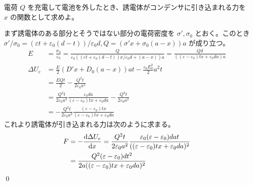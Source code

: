 \documentclass[uplatex,dvipdfmx,a4paper,11pt]{jlreq}
\makeatletter
\theoremstyle{definition}
\renewenvironment{proof}[1][\proofname]{\par
  \normalfont
  \topsep6\p@\@plus6\p@ \trivlist
  \item[\hskip\labelsep{\bfseries #1}\@addpunct{\bfseries}]\ignorespaces\quad\par
}{%
  \qed\endtrivlist\@endpefalse
}
\renewcommand\proofname{証明}
\makeatother
\begin{document}
\begin{problem}
電荷 $Q$ を充電して電池を外したとき、誘電体がコンデンサに引き込まれる力を $x$ の関数として求めよ。
\end{problem}
\begin{proof}
  まず誘電体のある部分とそうではない部分の電荷密度を $\sigma', \sigma_0$ とおく。このとき $\sigma'/\sigma_0 = (\varepsilon t + \varepsilon_0(d - t))/\varepsilon_0d, Q = (\sigma'x + \sigma_0(a - x))a$ が成り立つ。
  \begin{align}
    E          & = \frac{\sigma_0}{\varepsilon_0} = \frac{Q}{\varepsilon_0((\varepsilon t + \varepsilon_0(d - t))x/\varepsilon_0d + (a - x))a} = \frac{Qd}{((\varepsilon - \varepsilon_0)tx + \varepsilon_0da)a} \\
    \Delta U_e & = \frac{E}{2}(D'x + D_0(a - x))at - \frac{\varepsilon_0E_0^2}{2}a^2t                                                                                                                            \\
               & = \frac{EQt}{2} - \frac{Q^2t}{2\varepsilon_0a^2}                                                                                                                                                \\
               & = \frac{Q^2t}{2\varepsilon_0a^2}\frac{\varepsilon_0da}{(\varepsilon - \varepsilon_0)tx + \varepsilon_0da} - \frac{Q^2t}{2\varepsilon_0a^2}                                                      \\
               & = -\frac{Q^2t}{2\varepsilon_0a^2}\frac{(\varepsilon - \varepsilon_0)tx}{(\varepsilon - \varepsilon_0)tx + \varepsilon_0da}
  \end{align}
  これより誘電体が引き込まれる力は次のように求まる。
  \begin{align}
    F & = -\diff{\Delta U_e}{x} = \frac{Q^2t}{2\varepsilon_0a^2}\frac{\varepsilon_0(\varepsilon - \varepsilon_0)dat}{((\varepsilon - \varepsilon_0)tx + \varepsilon_0da)^2} \\
      & = \frac{Q^2(\varepsilon - \varepsilon_0)dt^2}{2a((\varepsilon - \varepsilon_0)tx + \varepsilon_0da)^2}                                                              \\
  \end{align}
\end{proof}
\end{document}
